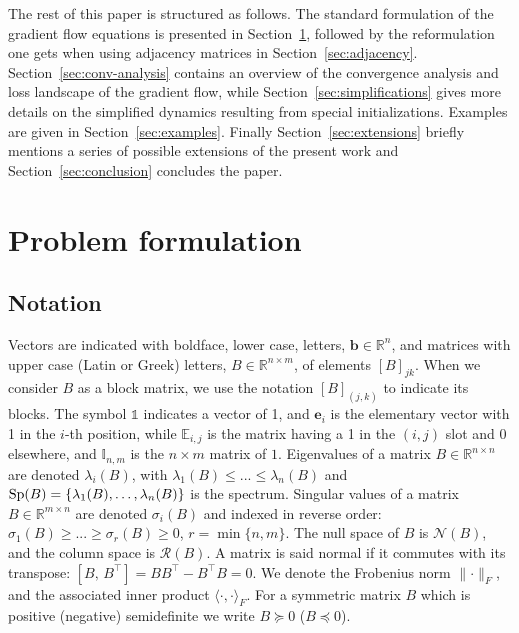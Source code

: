 \documentclass{article}
\newcommand{\1}{\mathds{1}}
\begin{document}
The rest of this paper is structured as follows. The standard formulation of the gradient flow equations is presented in Section~\ref{sec:standard}, followed by the reformulation one gets when using adjacency matrices in Section~\ref{sec:adjacency}. Section~\ref{sec:conv-analysis} contains an overview of the convergence analysis and loss landscape of the gradient flow, while Section~\ref{sec:simplifications} gives more details on the simplified dynamics resulting from special initializations. 
Examples are given in Section~\ref{sec:examples}. Finally Section~\ref{sec:extensions} briefly mentions a series of possible extensions of the present work and Section~\ref{sec:conclusion} concludes the paper.


\tableofcontents


\section{Problem formulation}
\label{sec:standard}

\subsection{Notation}
\label{sec:notation}
Vectors are indicated with boldface, lower case, letters, $ \mathbf{b}\in \mathbb{R}^n$, and matrices with upper case (Latin or Greek) letters, $ B \in \mathbb{R}^{n\times m}$, of elements $ [B]_{jk} $. When we consider $B$ as a block matrix, we use the notation $ [B]_{(j,k)}$ to indicate its blocks. 
The symbol $ \1 $ indicates a vector of 1, and $\mathbf{e}_i$ is the elementary vector with 1 in the $i$-th position, while $ \mathbb{E}_{i,j} $ is the matrix having a 1 in the $(i,j)$ slot and 0 elsewhere, and $ \mathbb{I}_{n,m}$ is the $ n\times m $ matrix of $1$. 
Eigenvalues of a matrix $B\in\mathbb{R}^{n\times n}$ are denoted $\lambda_i(B)$, with $\lambda_1(B)\leq...\leq\lambda_n(B)$ and $ {\rm Sp}(B) = \{ \lambda_1(B), \ldots, \lambda_n(B) \}$ is the spectrum. Singular values of a matrix $B\in\mathbb{R}^{m\times n}$ are denoted $\sigma_i(B)$ and indexed in reverse order: $\sigma_1(B)\geq...\geq\sigma_r(B)\geq 0$, $r=\min\{n,m\}$. The null space of $B$ is $\mathcal{N}(B)$, and the column space is $\mathcal{R}(B)$. A matrix is said normal if it commutes with its transpose: $ [B, \, B^\top ] =B B^\top - B^\top B =0 $. We denote the Frobenius norm $\lVert\cdot\rVert_F$, and the associated inner product $ \langle  \cdot, \cdot \rangle_F$.
For a symmetric matrix $B$ which is positive (negative) semidefinite we write $ B \succeq 0 $ ($ B \preceq 0 $).
\end{document}
